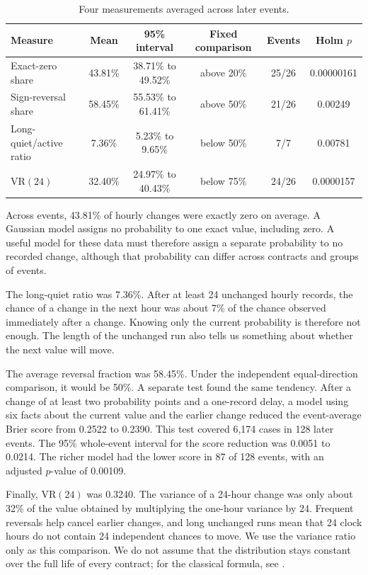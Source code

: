 \documentclass[10pt,twoside]{article}
\begin{document}
\begin{table}[htbp]
\centering
\caption{Four measurements averaged across later events.}
\label{tab:process-results}
\small
\setlength{\tabcolsep}{4pt}
\begin{tabular}{@{}lccccc@{}}
\toprule
Measure & Mean & 95\% interval & Fixed comparison & Events & Holm $p$ \\
\midrule
Exact-zero share & 43.81\% & 38.71\% to 49.52\% & above 20\% & 25/26 & 0.00000161 \\
Sign-reversal share & 58.45\% & 55.53\% to 61.41\% & above 50\% & 21/26 & 0.00249 \\
Long-quiet/active ratio & 7.36\% & 5.23\% to 9.65\% & below 50\% & 7/7 & 0.00781 \\
$\mathrm{VR}(24)$ & 32.40\% & 24.97\% to 40.43\% & below 75\% & 24/26 & 0.0000157 \\
\bottomrule
\end{tabular}
\end{table}

Across events, 43.81\% of hourly changes were exactly zero on average. A Gaussian model assigns no probability to one exact value, including zero. A useful model for these data must therefore assign a separate probability to no recorded change, although that probability can differ across contracts and groups of events.

The long-quiet ratio was 7.36\%. After at least 24 unchanged hourly records, the chance of a change in the next hour was about 7\% of the chance observed immediately after a change. Knowing only the current probability is therefore not enough. The length of the unchanged run also tells us something about whether the next value will move.

The average reversal fraction was 58.45\%. Under the independent equal-direction comparison, it would be 50\%. A separate test found the same tendency. After a change of at least two probability points and a one-record delay, a model using six facts about the current value and the earlier change reduced the event-average Brier score from 0.2522 to 0.2390. This test covered 6,174 cases in 128 later events. The 95\% whole-event interval for the score reduction was 0.0051 to 0.0214. The richer model had the lower score in 87 of 128 events, with an adjusted $p$-value of 0.00109.

Finally, $\mathrm{VR}(24)$ was 0.3240. The variance of a 24-hour change was only about 32\% of the value obtained by multiplying the one-hour variance by 24. Frequent reversals help cancel earlier changes, and long unchanged runs mean that 24 clock hours do not contain 24 independent chances to move. We use the variance ratio only as this comparison. We do not assume that the distribution stays constant over the full life of every contract; for the classical formula, see \citet{lo1988}.
\end{document}

